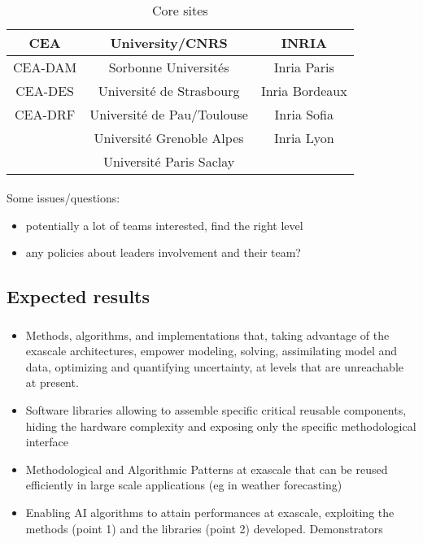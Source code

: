 \begin{frame}[fragile=singleslide]{\insertsectionhead}
  \framesubtitle{\insertsubsectionhead}
  \begin{table}[H]
    \centering
    \caption{Core sites}
    \begin{tabular}{@{} ccc @{}}
      \toprule
      \textbf{CEA} & \textbf{University/CNRS}  & \textbf{INRIA} \\
      \midrule
      CEA-DAM & Sorbonne Universités  & Inria Paris\\
      CEA-DES &  Université de Strasbourg &  Inria Bordeaux\\
      CEA-DRF & Université de Pau/Toulouse & Inria Sofia\\
      & Université Grenoble Alpes & Inria Lyon\\
      & Université Paris Saclay	& \\
      \bottomrule
    \end{tabular}
  \end{table}

\end{frame}
\begin{frame}[fragile=singleslide]{\insertsectionhead}
  \framesubtitle{\insertsubsectionhead}
  
  Some issues/questions:
  \begin{itemize}
      \item potentially a lot of teams interested, find the right level
      \item any policies about leaders  involvement  and their team?
  \end{itemize}
  
\end{frame}
\subsection{Expected results}

\begin{frame}
  \frametitle{\insertsectionhead}
  \framesubtitle{\insertsubsectionhead}
  \begin{itemize}
      \item   Methods, algorithms, and implementations that, taking advantage of the exascale architectures, empower modeling, solving, assimilating model and data, optimizing and quantifying uncertainty, at levels that are unreachable at present.
    \item Software libraries allowing to assemble specific critical reusable components, hiding the hardware complexity and exposing only the specific methodological interface
    \item Methodological and Algorithmic Patterns at exascale that can be reused efficiently in large scale applications (eg in weather forecasting)
    \item Enabling AI algorithms to attain performances at exascale, exploiting the methods (point 1) and the libraries (point 2) developed.
Demonstrators

  \end{itemize}


\end{frame}

